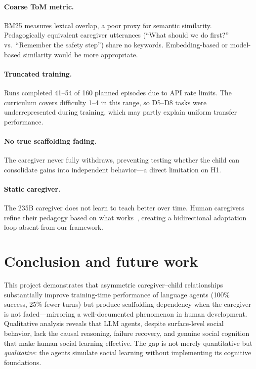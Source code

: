\documentclass{article}
\begin{document}
\paragraph{Coarse ToM metric.} BM25 measures lexical overlap, a poor proxy for semantic similarity. Pedagogically equivalent caregiver utterances (``What should we do first?'' vs.\ ``Remember the safety step'') share no keywords. Embedding-based or model-based similarity would be more appropriate.

\paragraph{Truncated training.} Runs completed 41--54 of 160 planned episodes due to API rate limits. The curriculum covers difficulty 1--4 in this range, so D5--D8 tasks were underrepresented during training, which may partly explain uniform transfer performance.

\paragraph{No true scaffolding fading.} The caregiver never fully withdraws, preventing testing whether the child can consolidate gains into independent behavior---a direct limitation on H1.

\paragraph{Static caregiver.} The 235B caregiver does not learn to teach better over time. Human caregivers refine their pedagogy based on what works~\citep{gweon2021inferential}, creating a bidirectional adaptation loop absent from our framework.

\section{Conclusion and future work}

This project demonstrates that asymmetric caregiver--child relationships substantially improve training-time performance of language agents (100\% success, 25\% fewer turns) but produce scaffolding dependency when the caregiver is not faded---mirroring a well-documented phenomenon in human development. Qualitative analysis reveals that LLM agents, despite surface-level social behavior, lack the causal reasoning, failure recovery, and genuine social cognition that make human social learning effective. The gap is not merely quantitative but \emph{qualitative}: the agents simulate social learning without implementing its cognitive foundations.
\end{document}
